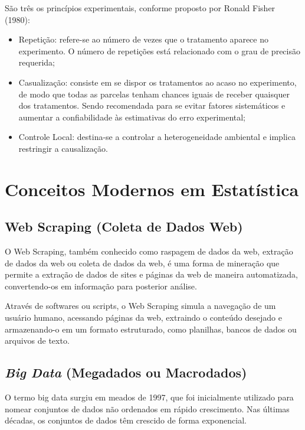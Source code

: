 São três os princípios experimentais, conforme proposto por Ronald Fisher (1980):

\begin{itemize}
    \item Repetição: refere-se ao número de vezes que o tratamento aparece no experimento. O número de repetições está relacionado com o grau de precisão requerida;
    \item Casualização: consiste em se dispor os tratamentos ao acaso no experimento, de modo que todas as parcelas tenham chances iguais de receber quaisquer dos tratamentos. Sendo recomendada para se evitar fatores sistemáticos e aumentar a confiabilidade às estimativas do erro experimental;
    \item Controle Local: destina-se a controlar a heterogeneidade ambiental e implica restringir a causalização.
\end{itemize}






\newpage
\section{Conceitos Modernos em Estatística}

\subsection{Web Scraping (Coleta de Dados Web)}

O Web Scraping, também conhecido como raspagem de dados da web, extração de dados da web ou coleta de dados da web, é uma forma de mineração que permite a extração de dados de sites e páginas da web de maneira au\-to\-ma\-ti\-za\-da, convertendo-os em informação para posterior análise.\vskip0.3cm

Através de softwares ou scripts, o Web Scraping simula a navegação de um usuário humano, acessando páginas da web, extraindo o conteúdo desejado e armazenando-o em um formato estruturado, como planilhas, bancos de dados ou arquivos de texto.

\subsection{\textit{Big Data} (Megadados ou Macrodados)}

O termo big data surgiu em meados de 1997, que foi inicialmente utilizado para nomear conjuntos de dados não ordenados em rápido crescimento. Nas últimas décadas, os conjuntos de dados têm crescido de forma exponencial.


